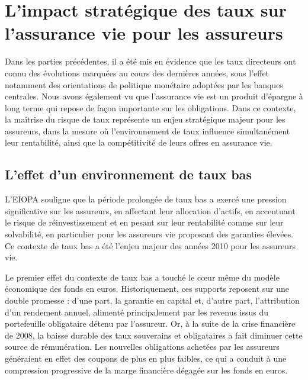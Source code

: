 \section{L'impact stratégique des taux sur l'assurance vie pour les assureurs}

Dans les parties précédentes, il a été mis en évidence que les taux directeurs ont connu des évolutions marquées au cours des dernières années, sous l'effet notamment des orientations de politique monétaire adoptées par les banques centrales. Nous avons également vu que l'assurance vie est un produit d'épargne à long terme qui repose de façon importante sur les obligations. Dans ce contexte, la maîtrise du risque de taux représente un enjeu stratégique majeur pour les assureurs, dans la mesure où l'environnement de taux influence simultanément leur rentabilité, ainsi que la compétitivité de leurs offres en assurance vie.

\subsection{L'effet d'un environnement de taux bas}

L'EIOPA souligne que la période prolongée de taux bas a exercé une pression significative sur les assureurs, en affectant leur allocation d'actifs, en accentuant le risque de réinvestissement et en pesant sur leur rentabilité comme sur leur solvabilité, en particulier pour les assureurs vie proposant des garanties élevées. Ce contexte de taux bas a été l'enjeu majeur des années 2010 pour les assureurs vie.

Le premier effet du contexte de taux bas a touché le cœur même du modèle économique des fonds en euros. Historiquement, ces supports reposent sur une double promesse : d'une part, la garantie en capital et, d'autre part, l'attribution d'un rendement annuel, alimenté principalement par les revenus issus du portefeuille obligataire détenu par l'assureur. Or, à la suite de la crise financière de 2008, la baisse durable des taux souverains et obligataires a fait diminuer cette source de rémunération. Les nouvelles obligations achetées par les assureurs généraient en effet des coupons de plus en plus faibles, ce qui a conduit à une compression progressive de la marge financière dégagée sur les fonds en euros. 

